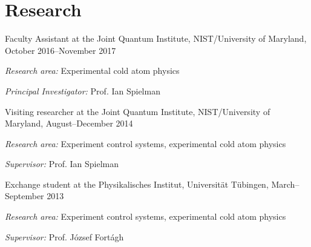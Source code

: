\documentclass[10pt,letterpaper]{article}
\renewenvironment{itemize}{
  \begin{list}{}{
    \setlength{\leftmargin}{1.5em}
    \setlength{\itemsep}{0.25em}
    \setlength{\parskip}{0pt}
    \setlength{\parsep}{0.25em}
  }
}{
  \end{list}
}
\begin{document}
\section*{Research}
\begin{itemize}

\item{Faculty Assistant at the Joint Quantum Institute, NIST/University of Maryland, October 2016--November 2017}
    \begin{itemize}
      \item \textit{Research area:}
      Experimental cold atom physics
      \item \textit{Principal Investigator:}
      Prof. Ian Spielman
    \end{itemize}

\item{Visiting researcher at the Joint Quantum Institute, NIST/University of Maryland, August--December 2014}
    \begin{itemize}
      \item \textit{Research area:}
      Experiment control systems, experimental cold atom physics
      \item \textit{Supervisor:}
      Prof. Ian Spielman
    \end{itemize}

\item{Exchange student at the Physikalisches Institut, Universität Tübingen, March–September 2013}
    \begin{itemize}
      \item \textit{Research area:}
      Experiment control systems, experimental cold atom physics
      \item \textit{Supervisor:}
      Prof. József Fortágh
    \end{itemize}
    

\end{itemize}
\end{document}
